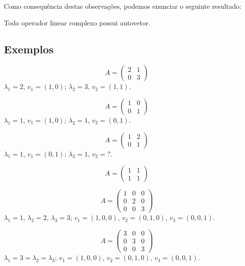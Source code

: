 Como consequência destas observações, podemos enunciar o seguinte resultado:
\begin{teo}
	Todo operador linear complexo possui autovetor.
\end{teo}

\subsection{Exemplos}

\begin{exemplo*}
   $$A =
   \begin{pmatrix}
      2 & 1 \\
      0 & 3
   \end{pmatrix}$$
   $\lambda_1=2$, $v_1 = (1,0)$; $\lambda_2=3$, $v_2=(1,1)$.
\end{exemplo*}

\begin{exemplo*}
   $$A =
   \begin{pmatrix}
      1 & 0 \\
      0 & 1
   \end{pmatrix}$$
   $\lambda_1=1$, $v_1 = (1,0)$; $\lambda_2=1$, $v_2=(0,1)$.
\end{exemplo*}

\begin{exemplo*}
   $$A =
   \begin{pmatrix}
      1 & 2 \\
      0 & 1
   \end{pmatrix}$$
   $\lambda_1=1$, $v_1 = (0,1)$; $\lambda_2=1$, $v_2=?$.
\end{exemplo*}

\begin{exemplo*}
   $$A =
   \begin{pmatrix}
      1 & 1 \\
      1 & 1
   \end{pmatrix}$$
\end{exemplo*}

\begin{exemplo*}
   $$A =
   \begin{pmatrix}
      1 & 0 & 0\\
      0 & 2 & 0\\
      0 & 0 & 3
   \end{pmatrix}$$
   $\lambda_1=1$, $\lambda_2=2$, $\lambda_3=3$; $v_1=(1,0,0)$, $v_2=(0,1,0)$, $v_3=(0,0,1)$.
\end{exemplo*}

\begin{exemplo*}
   $$A =
   \begin{pmatrix}
      3 & 0 & 0\\
      0 & 3 & 0\\
      0 & 0 & 3
   \end{pmatrix}$$
   $\lambda_1=3=\lambda_2=\lambda_3$; $v_1=(1,0,0)$, $v_2=(0,1,0)$, $v_3=(0,0,1)$.
\end{exemplo*}

